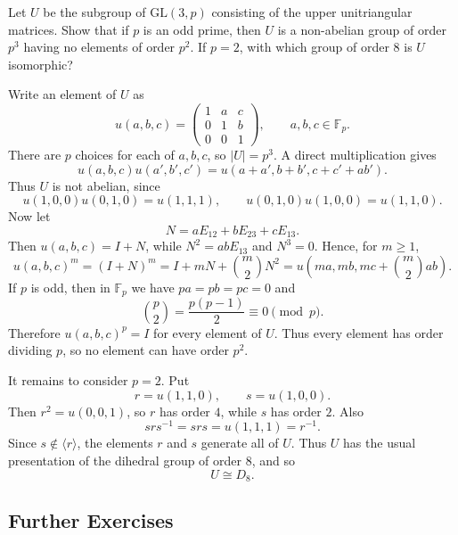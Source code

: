 \documentclass[../Odyssey_Project.tex]{subfiles}
\begin{document}
\begin{exercise}
\label{ex:8.6}
Let $U$ be the subgroup of $\mathrm{GL}(3,p)$ consisting of the upper unitriangular matrices. Show that if $p$ is an odd prime, then $U$ is a non-abelian group of order $p^3$ having no elements of order $p^2$. If $p = 2$, with which group of order $8$ is $U$ isomorphic?
\end{exercise}
\begin{solution}
Write an element of $U$ as
\[
    u(a,b,c)=
    \begin{pmatrix}
        1 & a & c\\
        0 & 1 & b\\
        0 & 0 & 1
    \end{pmatrix},
    \qquad a,b,c\in\mathbb{F}_p.
\]
There are $p$ choices for each of $a,b,c$, so $\lvert U\rvert=p^3$. A direct multiplication gives
\[
    u(a,b,c)u(a',b',c')
    =
    u(a+a',b+b',c+c'+ab').
\]
Thus $U$ is not abelian, since
\[
    u(1,0,0)u(0,1,0)=u(1,1,1),
    \qquad
    u(0,1,0)u(1,0,0)=u(1,1,0).
\]
Now let
\[
    N=aE_{12}+bE_{23}+cE_{13}.
\]
Then $u(a,b,c)=I+N$, while $N^2=abE_{13}$ and $N^3=0$. Hence, for $m\geq 1$,
\[
    u(a,b,c)^m
    =(I+N)^m
    =I+mN+\binom{m}{2}N^2
    =
    u\left(ma,mb,mc+\binom{m}{2}ab\right).
\]
If $p$ is odd, then in $\mathbb{F}_p$ we have $pa=pb=pc=0$ and
\[
    \binom{p}{2}=\frac{p(p-1)}{2}\equiv 0 \pmod p.
\]
Therefore $u(a,b,c)^p=I$ for every element of $U$. Thus every element has order dividing $p$, so no element can have order $p^2$.

It remains to consider $p=2$. Put
\[
    r=u(1,1,0),
    \qquad
    s=u(1,0,0).
\]
Then $r^2=u(0,0,1)$, so $r$ has order $4$, while $s$ has order $2$. Also
\[
    srs^{-1}=srs=u(1,1,1)=r^{-1}.
\]
Since $s\notin\langle r\rangle$, the elements $r$ and $s$ generate all of $U$. Thus $U$ has the usual presentation of the dihedral group of order $8$, and so
\[
    U\cong D_8.
\]
\end{solution}

\subsection*{Further Exercises}
\end{document}
